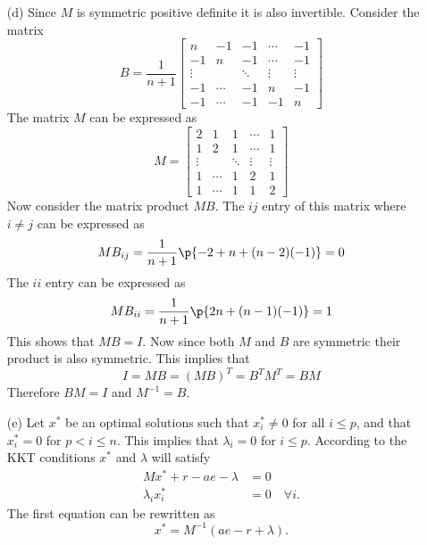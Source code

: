 \documentclass[11pt, oneside]{article}
\begin{document}
\begin{enumerate}
\begin{enumerate}
      \item[(d)] %
        Since $M$ is symmetric positive definite it is also invertible.
        Consider the matrix
        \[
          B = \frac{1}{n+1}
          \begin{bmatrix}
            n & -1 & -1 & \cdots & -1 \\
            -1 & n & -1 & \cdots & -1 \\
            \vdots & & \ddots & \vdots & \vdots \\
            -1 & \cdots & -1 & n & -1 \\
            -1 & \cdots & -1 & -1 & n
          \end{bmatrix}
        \]
        The matrix $M$ can be expressed as
        \[
          M =
          \begin{bmatrix}
            2 & 1 & 1 & \cdots & 1 \\
            1 & 2 & 1 & \cdots & 1 \\
            \vdots & & \ddots & \vdots & \vdots \\
            1 & \cdots & 1 & 2 & 1 \\
            1 & \cdots & 1 & 1 & 2
          \end{bmatrix}
        \]
        Now consider the matrix product $MB$.
        The $ij$ entry of this matrix where $i \neq j$ can be expressed as
        \[
          MB_{ij} = \frac{1}{n+1}\p{-2 + n + (n - 2)(-1)} = 0
        \]
        The $ii$ entry can be expressed as
        \[
          MB_{ii} = \frac{1}{n+1}\p{2n + (n - 1)(-1)} = 1
        \]
        This shows that $MB = I$.
        Now since both $M$ and $B$ are symmetric their product is
        also symmetric.
        This implies that
        \[
          I = MB = (MB)^T = B^T M^T = BM
        \]
        Therefore $BM = I$ and $M^{-1} = B$.

      \item[(e)] %
        Let $x^*$ be an optimal solutions such that $x^*_i \neq 0$ for all $i \le p$, and
        that $x^*_i = 0$ for $p < i \le n$.
        This implies that $\lambda_i = 0$ for $i \le p$.
        According to the KKT conditions $x^*$ and $\lambda$ will satisfy
        \begin{align*}
          Mx^* + r - ae - \lambda &= 0 \\
          \lambda_i x^*_i &= 0 \quad \forall i.
        \end{align*}
        The first equation can be rewritten as
        \[
          x^* = M^{-1}(ae - r + \lambda).
        \]


\end{enumerate}
\end{enumerate}
\end{document}
